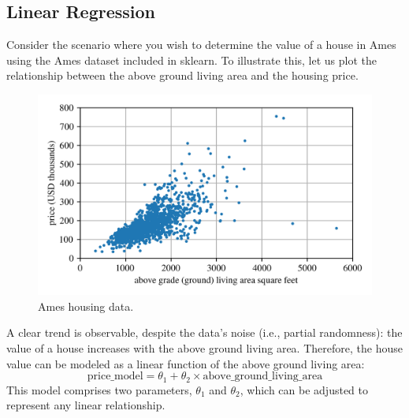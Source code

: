 \documentclass[12pt,letter]{article}
\begin{document}
\subsection{Linear Regression}



Consider the scenario where you wish to determine the value of a house in Ames using the Ames dataset included in sklearn. To illustrate this, let us plot the relationship between the above ground living area and the housing price.

\begin{figure}[H]
    \centering
    \includegraphics[]{../figures/Ames_simple_linear_regression_model_1.png}
    \caption{Ames housing data.}
    \label{fig:Ames_simple_linear_regression_model_1}
\end{figure}

A clear trend is observable, despite the data's noise (i.e., partial randomness): the value of a house increases with the above ground living area. Therefore, the house value can be modeled as a linear function of the above ground living area:
\begin{equation}
\text{price\_model} = \theta_1 + \theta_2 \times \text{above\_ground\_living\_area}
\end{equation}
This model comprises two parameters, $\theta_1$ and $\theta_2$, which can be adjusted to represent any linear relationship.
\end{document}
